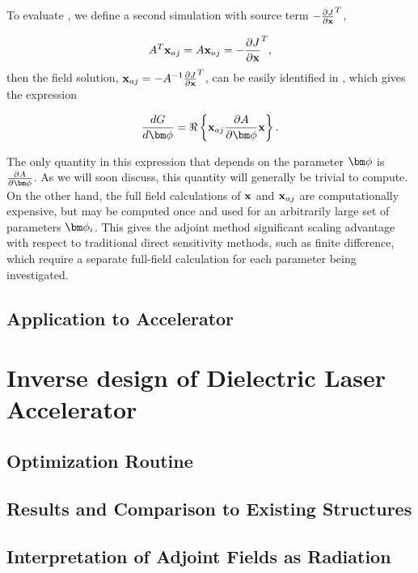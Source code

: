 To evaluate , we define a second simulation with source term $-\frac{\partial J}{\partial \mathbf{x}}^T$,

\begin{equation}
A^T\mathbf{x}_{aj} = A\mathbf{x}_{aj} = -\frac{\partial J}{\partial \mathbf{x}}^T,
\label{eq:adjoint_source}
\end{equation}
then the field solution, $\mathbf{x}_{aj} = -A^{-1}\frac{\partial J}{\partial \mathbf{x}}^T$, can be easily identified in , which gives the expression

\begin{equation}
\dfrac{G}{\bfphi} = \real{ \bfx_{aj} \pfrac{A}{\bfphi} \bfx }.
\label{eq:final_form_DGdgamma}
\end{equation}

The only quantity in this expression that depends on the parameter $\bfphi$ is $\pfrac{A}{\bfphi}$.  As we will soon discuss, this quantity will generally be trivial to compute.
On the other hand, the full field calculations of $\mathbf{x}$ and $\mathbf{x}_{aj}$ are computationally expensive, but may be computed once and used for an arbitrarily large set of parameters $\bfphi_i$.
This gives the adjoint method significant scaling advantage with respect to traditional direct sensitivity methods, such as finite difference, which require a separate full-field calculation for each parameter being investigated.

\subsection{Application to Accelerator}



\section{Inverse design of Dielectric Laser Accelerator}{}

\subsection{Optimization Routine}

\subsection{Results and Comparison to Existing Structures}

\subsection{Interpretation of Adjoint Fields as Radiation}
